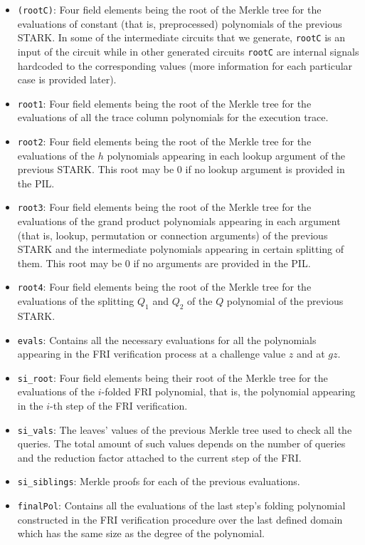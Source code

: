 \begin{itemize}

\item \texttt{(rootC)}: Four field elements being the root of the Merkle tree for the evaluations of constant (that is, preprocessed) polynomials of the previous STARK.
In some of the intermediate circuits that we generate, \texttt{rootC} is an input of the circuit while in other generated circuits \texttt{rootC} are internal signals 
hardcoded to the corresponding values (more information for each particular case is provided later).

\item \texttt{root1}: Four field elements being the root of the Merkle tree for the evaluations of all the trace column polynomials for the execution trace. 

\item \texttt{root2}: Four field elements being the root of the Merkle tree for the evaluations of the $h$ polynomials appearing in each lookup argument of the previous STARK. This root may be $0$ if no lookup argument is provided in the PIL.  

\item \texttt{root3}: Four field elements being the root of the Merkle tree for the evaluations of the grand product polynomials appearing in each argument (that is, lookup, permutation or connection arguments) of the previous STARK and the intermediate polynomials appearing in certain splitting of them. This root may be $0$ if no arguments are provided in the PIL. 

\item \texttt{root4}: Four field elements being the root of the Merkle tree for the evaluations of the splitting $Q_1$ and $Q_2$ of the $Q$ polynomial of the previous STARK.

\item \texttt{evals}: Contains all the necessary evaluations for all the polynomials appearing in the FRI verification process at a challenge value $z$ and at $gz$. 

\item \texttt{si\_root}: Four field elements being their root of the Merkle tree for the evaluations of the $i$-folded FRI polynomial, that is, the polynomial appearing in the $i$-th step of the FRI verification. 

\item \texttt{si\_vals}: The leaves' values of the previous Merkle tree used to check all the queries. The total amount of such values depends on the number of queries and the reduction factor attached to the current step of the FRI. 


\item \texttt{si\_siblings}: Merkle proofs for each of the previous evaluations.

\item \texttt{finalPol}: Contains all the evaluations of the last step's folding polynomial constructed in the FRI verification procedure over the last defined domain which has the same size as the degree of the polynomial. 

\end{itemize}

